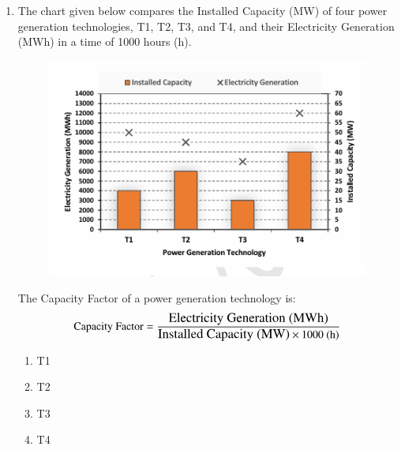 \documentclass[a4paper,12pt]{exam}
\numberwithin{equation}{enumi}
\numberwithin{figure}{enumi}
\begin{document}
\begin{enumerate}
\hfill{}

\begin{multicols}{4}
\begin{enumerate}
    \item 12
    \item 14
    \item 10
    \item 28
\end{enumerate}
\end{multicols}

\item The chart given below compares the Installed Capacity (MW) of four power 
generation technologies, T1, T2, T3, and T4, and their Electricity Generation  
(MWh) in a time of 1000 hours (h). 

\begin{figure}[H]
\centering
\includegraphics[width=1\columnwidth]{figs/Q8.png}
\label{fig:Q8.png}
\end{figure}


\hspace{0.75cm}The Capacity Factor of a power generation technology is:  \\


\begin{equation*}
\text{Capacity Factor} = \frac{\text{\large Electricity Generation (MWh)}}{\text{\large Installed Capacity (MW)} \times \text{1000 (h)}}
\end{equation*} 

\hfill{}

\begin{multicols}{4}
\begin{enumerate}
 \item T1
\item T2
\item T3
\item T4
\end{enumerate} 
\end{multicols}


\end{enumerate}
\end{document}
